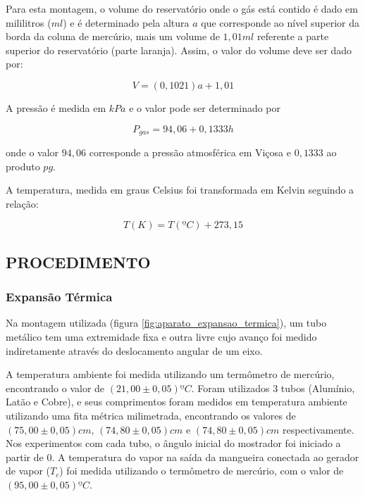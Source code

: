 \documentclass[10pt]{article}
\begin{document}
Para esta montagem, o volume do reservatório onde o gás está contido é dado em mililitros ($ml$) e é determinado pela altura $a$ que corresponde ao nível superior da borda da coluna de mercúrio, mais um volume de $1,01ml$ referente a parte superior do reservatório (parte laranja). Assim, o valor do volume deve ser dado por:

\begin{equation}
	V = (0,1021)a + 1,01
	\label{eq:volume_gases_ideais}
\end{equation}

A pressão é medida em $kPa$ e o valor pode ser determinado por

\begin{equation}
P_{gas} = 94,06 + 0,1333h
\label{eq:pressao_gases_ideais}
\end{equation}

onde o valor $94,06$ corresponde a pressão atmosférica em Viçosa e $0,1333$ ao produto $pg$.

A temperatura, medida em graus Celsius foi transformada em Kelvin seguindo a relação:

\begin{equation}
T(K) = T(ºC) + 273,15
\label{eq:celsius_kelvin}
\end{equation}

\subsection{PROCEDIMENTO}

\subsubsection{Expansão Térmica}
Na montagem utilizada (figura \ref{fig:aparato_expansao_termica}), um tubo metálico tem uma extremidade fixa e outra livre cujo avanço foi medido indiretamente através do deslocamento angular de um eixo.

A temperatura ambiente foi medida utilizando um termômetro de mercúrio, encontrando o valor de $(21,00 \pm 0,05) ºC$. Foram utilizados 3 tubos (Alumínio, Latão e Cobre), e seus comprimentos foram medidos em temperatura ambiente utilizando uma fita métrica milimetrada, encontrando os valores de $(75,00 \pm 0,05)cm$, $(74,80 \pm 0,05) cm$ e $(74,80 \pm 0,05)cm$ respectivamente. Nos experimentos com cada tubo, o ângulo inicial do mostrador foi iniciado a partir de $0$. A temperatura do vapor na saída da mangueira conectada ao gerador de vapor ($T_c$) foi medida utilizando o termômetro de mercúrio, com o valor de $(95,00 \pm 0,05)ºC$.
\end{document}
